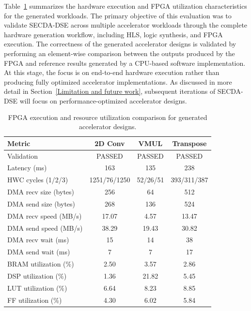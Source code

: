 Table~\ref{tab:workload_comparison} summarizes the hardware execution and FPGA utilization characteristics for the generated workloads. The primary objective of this evaluation was to validate SECDA-DSE across multiple accelerator workloads through the complete hardware generation workflow, including HLS, logic synthesis, and FPGA execution. %
The correctness of the generated accelerator designs is validated by performing an element-wise comparison between the outputs produced by the FPGA and reference results generated by a CPU-based software implementation.
At this stage, the focus is on end-to-end hardware execution rather than producing fully optimized accelerator implementations. As discussed in more detail in Section~\ref{Limitation and future work}, subsequent iterations of SECDA-DSE will focus on performance-optimized accelerator designs.


\begin{scriptsize}
\begin{table}[t]
\centering
\caption{FPGA execution and resource utilization comparison for generated accelerator designs.}
\label{tab:workload_comparison}
\setlength{\tabcolsep}{3pt}
\renewcommand{\arraystretch}{1.1}
\begin{tabular}{|l|c|c|c|}
\hline
\textbf{Metric} & \textbf{2D Conv} & \textbf{VMUL} & \textbf{Transpose} \\
\hline
\hline
Validation & PASSED & PASSED & PASSED \\
\hline
Latency (ms) & 163 & 135 & 238 \\
\hline
HWC cycles (1/2/3) & 1251/76/1250 & 52/26/51 & 393/311/387 \\
\hline
\hline
DMA recv size (bytes) & 256 & 64 & 512 \\
\hline
DMA send size (bytes) & 268 & 136 & 524 \\
\hline
DMA recv speed (MB/s) & 17.07 & 4.57 & 13.47 \\
\hline
DMA send speed (MB/s) & 38.29 & 19.43 & 30.82 \\
\hline
DMA recv wait (ms) & 15 & 14 & 38 \\
\hline
DMA send wait (ms) & 7 & 7 & 17 \\
\hline
\hline
BRAM utilization (\%) & 2.50 & 3.57 & 2.86 \\
\hline
DSP utilization (\%) & 1.36 & 21.82 & 5.45 \\
\hline
LUT utilization (\%) & 6.64 & 8.23 & 8.85 \\
\hline
FF utilization (\%) & 4.30 & 6.02 & 5.84 \\
\hline
\end{tabular}
\end{table}
\end{scriptsize}


